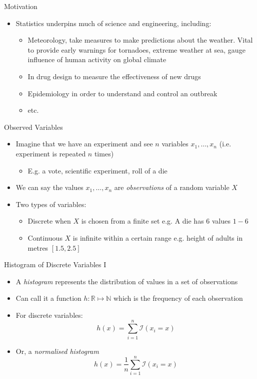\documentclass{beamer}
\begin{document}
\begin{frame}{Motivation} 
\begin{itemize} 
 \item Statistics underpins much of science and engineering, including: 
\begin{itemize} 
\item Meteorology, take measures to make predictions about the weather. Vital to provide early warnings for tornadoes, extreme weather at sea, gauge influence of human activity on global climate 
\item In drug design to measure the effectiveness of new drugs 
\item Epidemiology in order to understand and control an outbreak 
\item etc. 
\end{itemize} 
\end{itemize}
\end{frame}

\begin{frame}{Observed Variables}
\begin{itemize} 
 \item Imagine that we have an experiment and see $n$ variables $x_1, \ldots, x_n$ (i.e. experiment is repeated $n$ times)
\begin{itemize} 
\item E.g. a vote, scientific experiment, roll of a die
\end{itemize}
\item We can say the values $x_1, \ldots, x_n$ are \emph{observations} of a random variable $X$ 
\item Two types of variables: 
\begin{itemize} 
 \item Discrete when $X$ is chosen from a finite set e.g. A die has 6 values $1-6$ 
\item Continuous $X$ is infinite within a certain range e.g. height of adults in metres $[1.5, 2.5]$
\end{itemize}
\end{itemize}
\end{frame}

\begin{frame}{Histogram of Discrete Variables I} 
\begin{itemize} 
 \item A \emph{histogram} represents the distribution of values in a set of observations
\item Can call it a function $h: \mathbb{R} \mapsto \mathbb{N}$ which is the frequency of each observation 
\item For discrete variables:
\begin{displaymath} 
 h(x) = \sum_{i=1}^n \mathcal{I}(x_i = x)
\end{displaymath}
\item Or, a \emph{normalised histogram}
\begin{displaymath} 
  h(x) = \frac{1}{n}\sum_{i=1}^n \mathcal{I}(x_i = x)
\end{displaymath}
\end{itemize}
\end{frame}
\end{document}
